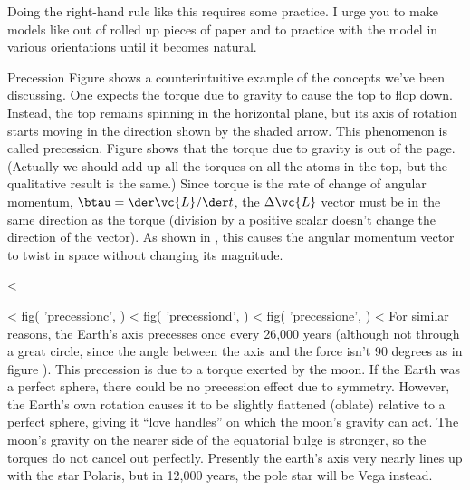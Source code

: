 Doing the right-hand rule like this requires some practice.
I urge you to make models like  out of rolled
up pieces of paper and to practice with the model in various
orientations until it becomes natural.

\begin{eg}{Precession}
Figure  shows a counterintuitive
example of the concepts we've been discussing. One expects
the torque due to gravity to cause the top to flop down.
Instead, the top remains spinning in the horizontal plane,
but its axis of rotation starts moving in the direction
shown by the shaded arrow. This phenomenon is called
precession.
Figure  shows that the torque due to
gravity is out of the page. (Actually we should add up all
the torques on all the atoms in the top, but the qualitative
result is the same.)
Since torque is the rate of change
of angular momentum, $\btau=\der\vc{L}/\der t$, 
the $\Delta\vc{L}$ vector must be in
the same direction as the torque (division by a positive
scalar doesn't change the direction of the vector). As shown
in , this causes the angular momentum vector to
twist in space without changing its magnitude.
\end{eg}

<%

<%
  fig(
    'precessionc',
  )
\spacebetweenfigs
<%
  fig(
    'precessiond',
  )
\spacebetweenfigs
<%
  fig(
    'precessione',
  )
<%
For similar reasons, the Earth's axis precesses once every
26,000 years (although not through a great circle, since the
angle between the axis and the force isn't 90 degrees as
in figure ). This precession is due to a
torque exerted by the moon. If the Earth was a perfect
sphere, there could be no precession effect due to symmetry.
However, the Earth's own rotation causes it to be slightly
flattened (oblate) relative to a perfect sphere, giving it
``love handles'' on which the moon's gravity can act. The
moon's gravity on the nearer side of the equatorial bulge 
is stronger, so the torques do not cancel out perfectly. 
Presently the earth's axis very nearly lines up with the
star Polaris, but in 12,000 years, the pole star will be Vega
instead.

